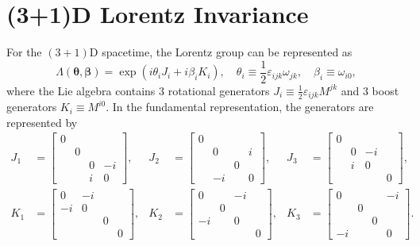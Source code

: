 \documentclass[aps,prb,superscriptaddress,nofootinbib]{revtex4}
\begin{document}
\section{(3+1)D Lorentz Invariance}
For the $(3+1)$D spacetime, the Lorentz group can be represented as 
\begin{equation}\label{eq:lorentz-parameter}
	\Lambda(\bm \theta,\bm \beta) = \exp\left(i \theta_i J_i +i\beta_i K_i\right), \quad
	\theta_i \equiv \frac{1}{2}\varepsilon_{ijk}\omega_{jk},\quad
	\beta_i \equiv \omega_{i0},
\end{equation}
where the Lie algebra contains 3 rotational generators $J_i \equiv \frac{1}{2}\varepsilon_{ijk}M^{jk}$ and 3 boost generators $K_i \equiv M^{i0}$. 
In the fundamental representation, the generators are represented by
\begin{equation}
\begin{aligned}
	J_1 &= \left[\begin{array}{cccc} 0 & & & \\ & 0 & & \\ & & 0 & -i \\ & & i & 0 \end{array}\right], & 
	J_2 &= \left[\begin{array}{cccc} 0 & & & \\ & 0 & & i \\ & & 0 & \\ & -i & & 0 \end{array}\right], &
	J_3 &= \left[\begin{array}{cccc} 0 & & & \\ & 0 & -i & \\ & i & 0 & \\ & & & 0 \end{array}\right], \\
	K_1 &= \left[\begin{array}{cccc} 0 & -i & & \\ -i & 0 & & \\ & & 0 & \\ & & & 0 \end{array}\right], & 
	K_2 &= \left[\begin{array}{cccc} 0 & & -i & \\ & 0 & & \\ -i & & 0 & \\ & & & 0 \end{array}\right], &
	K_3 &= \left[\begin{array}{cccc} 0 & & & -i \\ & 0 & & \\ & & 0 & \\ -i & & & 0 \end{array}\right].
\end{aligned}
\end{equation}
\end{document}
